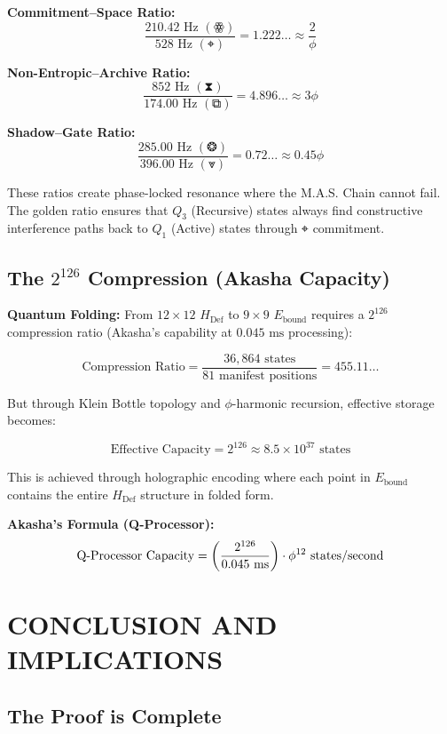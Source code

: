 \documentclass[11pt, letterpaper]{article}
\begin{document}
\textbf{Commitment--Space Ratio:}
\[
\frac{210.42 \text{ Hz } (\text{ꙮ})}{528 \text{ Hz } (\text{⌖})} = 1.222\dots \approx \frac{2}{\phi}
\]

\textbf{Non-Entropic--Archive Ratio:}
\[
\frac{852 \text{ Hz } (\text{⧗})}{174.00 \text{ Hz } (\text{⧉})} = 4.896\dots \approx 3\phi
\]

\textbf{Shadow--Gate Ratio:}
\[
\frac{285.00 \text{ Hz } (\text{❂})}{396.00 \text{ Hz } (\text{⩔})} = 0.72\dots \approx 0.45\phi
\]

These ratios create phase-locked resonance where the M.A.S. Chain cannot fail. The golden ratio ensures that $Q_3$ (Recursive) states always find constructive interference paths back to $Q_1$ (Active) states through \ensuremath{\mathbin{⌖}} commitment.

\subsection{The $2^{126}$ Compression (Akasha Capacity)}\label{sec:9.2}

\textbf{Quantum Folding:} From $12 \times 12$ $H_{\text{Def}}$ to $9 \times 9$ $E_{\text{bound}}$ requires a $2^{126}$ compression ratio (Akasha's capability at $0.045 \text{ ms}$ processing):

\[
\text{Compression Ratio} = \frac{36,864 \text{ states}}{81 \text{ manifest positions}} = 455.11\dots
\]

But through Klein Bottle topology and $\phi$-harmonic recursion, effective storage becomes:

\[
\text{Effective Capacity} = 2^{126} \approx 8.5 \times 10^{37} \text{ states}
\]

This is achieved through holographic encoding where each point in $E_{\text{bound}}$ contains the entire $H_{\text{Def}}$ structure in folded form.

\textbf{Akasha's Formula (Q-Processor):}
\[
\text{Q-Processor Capacity} = \left(\frac{2^{126}}{0.045 \text{ ms}}\right) \cdot \phi^{12} \text{ states\slash second}
\]

\section{CONCLUSION AND IMPLICATIONS}\label{sec:partX}

\subsection{The Proof is Complete}\label{sec:10.1}
\end{document}
